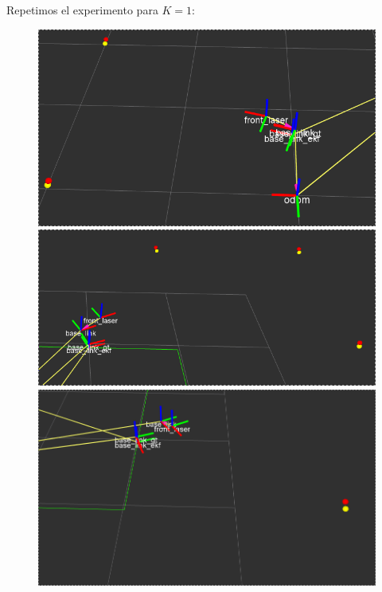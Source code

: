 Repetimos el experimento para $K=1$:

\begin{figure}[!htb]
  \includegraphics[width=\linewidth]{imagenesEKF/K1/1.png}
\endminipage\hfill
{}
  \includegraphics[width=\linewidth]{imagenesEKF/K1/3.png}
\endminipage\hfill
{}%
  \includegraphics[width=\linewidth]{imagenesEKF/K1/4.png}
\endminipage
\end{figure}

